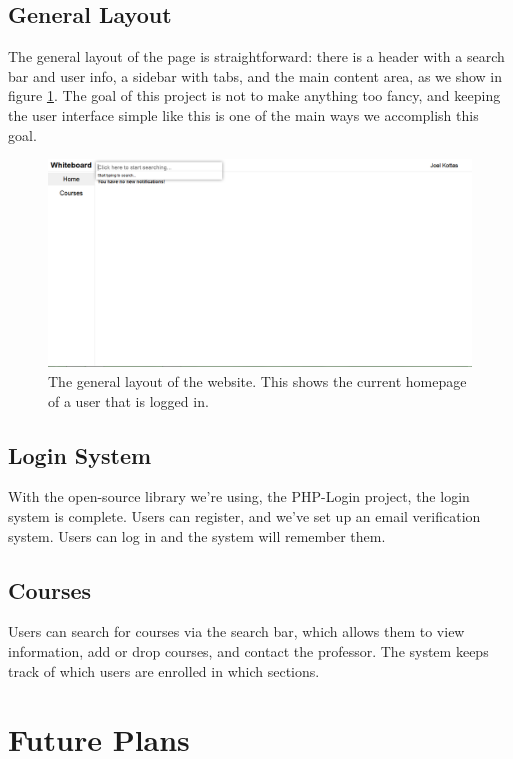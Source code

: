 \documentclass{article}
\begin{document}
\subsection{General Layout}

The general layout of the page is straightforward: there is a header with a
search bar and user info, a sidebar with tabs, and the main content area, as we
show in figure \ref{fig:gl}. The goal of this project is not to make anything
too fancy, and keeping the user interface simple like this is one of the main
ways we accomplish this goal.

\begin{figure}
    \includegraphics[width=\linewidth]{general_layout}
    \caption{The general layout of the website. This shows the current homepage
    of a user that is logged in.}
    \label{fig:gl}
\end{figure}

\subsection{Login System}

With the open-source library we're using, the PHP-Login project, the
login system is complete. Users can register, and we've set up an email
verification system. Users can log in and the system will remember them.

\subsection{Courses}

Users can search for courses via the search bar, which allows them to view information,
add or drop courses, and contact the professor. The system keeps track of which users
are enrolled in which sections.

\section{Future Plans}
\end{document}

